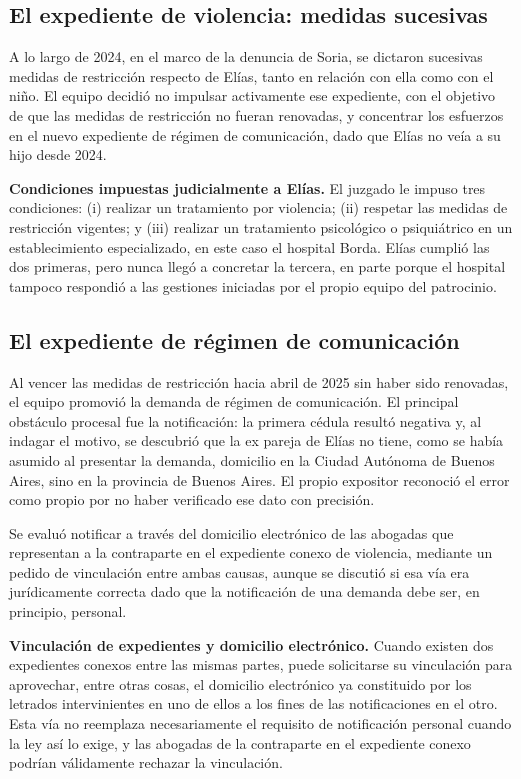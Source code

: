 \documentclass[12pt,oneside]{book}
\begin{document}
\subsection{El expediente de violencia: medidas sucesivas}

A lo largo de 2024, en el marco de la denuncia de Soria, se dictaron sucesivas medidas de restricción respecto de Elías, tanto en relación con ella como con el niño. El equipo decidió no impulsar activamente ese expediente, con el objetivo de que las medidas de restricción no fueran renovadas, y concentrar los esfuerzos en el nuevo expediente de régimen de comunicación, dado que Elías no veía a su hijo desde 2024.

\begin{important}
\textbf{Condiciones impuestas judicialmente a Elías.} El juzgado le impuso tres condiciones: (i) realizar un tratamiento por violencia; (ii) respetar las medidas de restricción vigentes; y (iii) realizar un tratamiento psicológico o psiquiátrico en un establecimiento especializado, en este caso el hospital Borda. Elías cumplió las dos primeras, pero nunca llegó a concretar la tercera, en parte porque el hospital tampoco respondió a las gestiones iniciadas por el propio equipo del patrocinio.
\end{important}

\subsection{El expediente de régimen de comunicación}

Al vencer las medidas de restricción hacia abril de 2025 sin haber sido renovadas, el equipo promovió la demanda de régimen de comunicación. El principal obstáculo procesal fue la notificación: la primera cédula resultó negativa y, al indagar el motivo, se descubrió que la ex pareja de Elías no tiene, como se había asumido al presentar la demanda, domicilio en la Ciudad Autónoma de Buenos Aires, sino en la provincia de Buenos Aires. El propio expositor reconoció el error como propio por no haber verificado ese dato con precisión.

Se evaluó notificar a través del domicilio electrónico de las abogadas que representan a la contraparte en el expediente conexo de violencia, mediante un pedido de vinculación entre ambas causas, aunque se discutió si esa vía era jurídicamente correcta dado que la notificación de una demanda debe ser, en principio, personal.

\begin{important}
\textbf{Vinculación de expedientes y domicilio electrónico.} Cuando existen dos expedientes conexos entre las mismas partes, puede solicitarse su vinculación para aprovechar, entre otras cosas, el domicilio electrónico ya constituido por los letrados intervinientes en uno de ellos a los fines de las notificaciones en el otro. Esta vía no reemplaza necesariamente el requisito de notificación personal cuando la ley así lo exige, y las abogadas de la contraparte en el expediente conexo podrían válidamente rechazar la vinculación.
\end{important}
\end{document}
